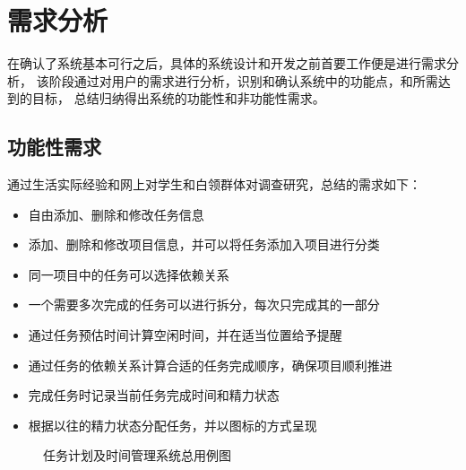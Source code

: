 \chapter{需求分析}
在确认了系统基本可行之后，具体的系统设计和开发之前首要工作便是进行需求分析，
该阶段通过对用户的需求进行分析，识别和确认系统中的功能点，和所需达到的目标，
总结归纳得出系统的功能性和非功能性需求。
\section{功能性需求}
通过生活实际经验和网上对学生和白领群体对调查研究，总结的需求如下：
\begin{itemize}
	\item 自由添加、删除和修改任务信息
	\item 添加、删除和修改项目信息，并可以将任务添加入项目进行分类
	\item 同一项目中的任务可以选择依赖关系
	\item 一个需要多次完成的任务可以进行拆分，每次只完成其的一部分
	\item 通过任务预估时间计算空闲时间，并在适当位置给予提醒
	\item 通过任务的依赖关系计算合适的任务完成顺序，确保项目顺利推进
	\item 完成任务时记录当前任务完成时间和精力状态
	\item 根据以往的精力状态分配任务，并以图标的方式呈现
\end{itemize}

\begin{figure}[!htp]
	\centering
	\caption{任务计划及时间管理系统总用例图}
    \label{fig:use_case}
\end{figure}


